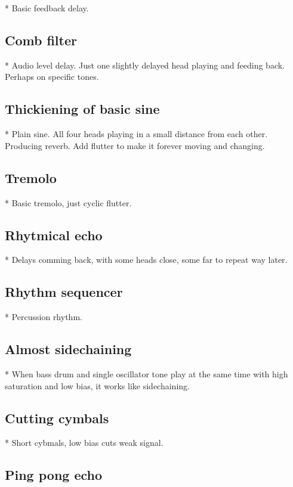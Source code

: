 \documentclass[11pt]{article}
\begin{document}
* Basic feedback delay.

\subsection{Comb filter}

* Audio level delay. Just one slightly delayed head playing and feeding back.
  Perhaps on specific tones.

\subsection{Thickiening of basic sine}

* Plain sine. All four heads playing in a small distance from each other.
  Producing reverb. Add flutter to make it forever moving and changing.

\subsection{Tremolo}

* Basic tremolo, just cyclic flutter.

\subsection{Rhytmical echo}

* Delays comming back, with some heads close, some far to repeat way later.

\subsection{Rhythm sequencer}

* Percussion rhythm.

\subsection{Almost sidechaining}

* When bass drum and single oscillator tone play at the same time with high
  saturation and low bias, it works like sidechaining.

\subsection{Cutting cymbals}

* Short cybmals, low bias cuts weak signal.

\subsection{Ping pong echo}
\end{document}
